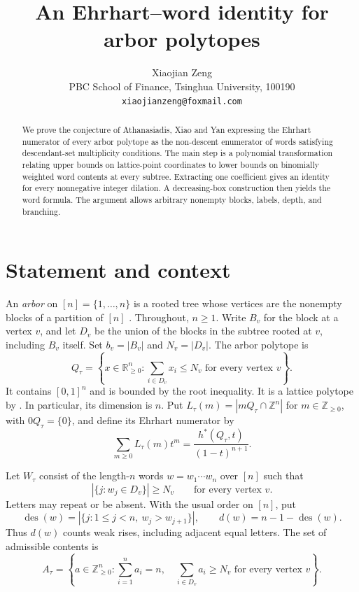 \documentclass[11pt]{article}
\title{An Ehrhart--word identity for arbor polytopes}
\author{Xiaojian Zeng\\[3pt]
  \small PBC School of Finance, Tsinghua University, 100190\\
  \small\texttt{xiaojianzeng@foxmail.com}}
\date{}
\newcommand{\N}{\mathbb Z_{\geq0}}
\newcommand{\R}{\mathbb R}
\newcommand{\Z}{\mathbb Z}
\newcommand{\des}{\operatorname{des}}
\begin{document}
\maketitle
\begin{abstract}
We prove the conjecture of Athanasiadis, Xiao and Yan expressing the
Ehrhart numerator of every arbor polytope as the non-descent enumerator
of words satisfying descendant-set multiplicity conditions. The main step
is a polynomial transformation relating upper bounds on lattice-point
coordinates to lower bounds on binomially weighted word contents at every
subtree. Extracting one coefficient gives an identity for every nonnegative
integer dilation. A decreasing-box construction then yields the word
formula. The argument allows arbitrary nonempty blocks, labels, depth,
and branching.
\end{abstract}

\section{Statement and context}

An \emph{arbor} on $[n]=\{1,\ldots,n\}$ is a rooted tree whose vertices
are the nonempty blocks of a partition of $[n]$ \cite{Chapoton}.
Throughout, $n\geq1$. Write $B_v$ for the block at a vertex $v$, and let
$D_v$ be the union of the blocks in the subtree rooted at $v$, including
$B_v$ itself. Set $b_v=|B_v|$ and $N_v=|D_v|$. The arbor polytope is
\begin{equation}\label{eq:polytope}
 Q_\tau=\left\{x\in\R_{\geq0}^n:
          \sum_{i\in D_v}x_i\leq N_v\text{ for every vertex }v\right\}.
\end{equation}
It contains $[0,1]^n$ and is bounded by the root inequality. It is a
lattice polytope by \cite[Lemma~1.2]{Chapoton}. In particular, its
dimension is $n$. Put $L_\tau(m)=|mQ_\tau\cap\Z^n|$ for $m\in\N$, with
$0Q_\tau=\{0\}$, and define its Ehrhart numerator by
\begin{equation}\label{eq:ehrhart}
 \sum_{m\geq0}L_\tau(m)t^m=
       \frac{h^*(Q_\tau,t)}{(1-t)^{n+1}}.
\end{equation}

Let $W_\tau$ consist of the length-$n$ words $w=w_1\cdots w_n$ over $[n]$
such that
\[
 |\{j:w_j\in D_v\}|\geq N_v\qquad\text{for every vertex }v.
\]
Letters may repeat or be absent. With the usual order on $[n]$, put
\[
 \des(w)=|\{j:1\leq j<n,\ w_j>w_{j+1}\}|,
 \qquad d(w)=n-1-\des(w).
\]
Thus $d(w)$ counts weak rises, including adjacent equal letters.
The set of admissible contents is
\begin{equation}\label{eq:contents}
 A_\tau=\left\{a\in\N^n:\sum_{i=1}^n a_i=n,\quad
         \sum_{i\in D_v}a_i\geq N_v\text{ for every vertex }v\right\}.
\end{equation}
\end{document}
